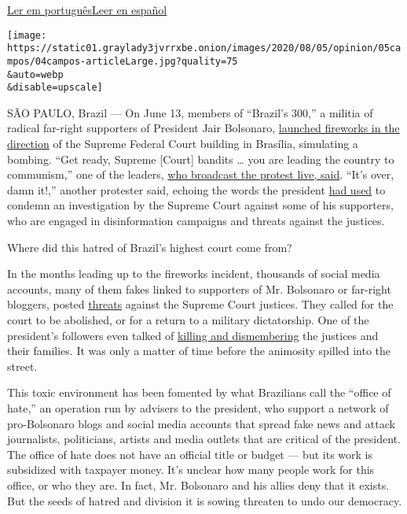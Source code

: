 \href{https://www.nytimes3xbfgragh.onion/pt/2020/08/04/opinion/international-world/bolsonaro-gabinete-do-odio.html}{Ler
em
português}\href{https://www.nytimes3xbfgragh.onion/es/2020/08/04/espanol/opinion/bolsonaro-oficina-odio-brasil.html}{Leer
en español}

\texttt{[image: https://static01.graylady3jvrrxbe.onion/images/2020/08/05/opinion/05campos/04campos-articleLarge.jpg?quality=75\\\&auto=webp\\\&disable=upscale]}

SÃO PAULO, Brazil --- On June 13, members of ``Brazil's 300,'' a militia
of radical far-right supporters of President Jair Bolsonaro,
\href{https://www1.folha.uol.com.br/poder/2020/05/sara-winter-xinga-moraes-diz-querer-trocar-socos-com-ele-e-promete-inferniza-lo.shtml}{launched
fireworks in the direction} of the Supreme Federal Court building in
Brasília, simulating a bombing. ``Get ready, Supreme {[}Court{]} bandits
\ldots{} you are leading the country to communism,'' one of the leaders,
\href{https://www.metropoles.com/brasil/video-bolsonaristas-lancam-fogos-de-artificio-em-predio-do-stf}{who
broadcast the protest live, said}. ``It's over, damn it!,'' another
protester said, echoing the words the president
\href{https://www.youtube.com/watch?v=I2bZoC8FHJI}{had used} to condemn
an investigation by the Supreme Court against some of his supporters,
who are engaged in disinformation campaigns and threats against the
justices.

Where did this hatred of Brazil's highest court come from?

In the months leading up to the fireworks incident, thousands of social
media accounts, many of them fakes linked to supporters of Mr. Bolsonaro
or far-right bloggers, posted
\href{https://www1.folha.uol.com.br/poder/2020/05/sara-winter-xinga-moraes-diz-querer-trocar-socos-com-ele-e-promete-inferniza-lo.shtml}{threats}
against the Supreme Court justices. They called for the court to be
abolished, or for a return to a military dictatorship. One of the
president's followers even talked of
\href{https://g1.globo.com/politica/noticia/2020/06/17/moraes-vota-pela-legalidade-e-continuidade-do-inquerito-das-fake-news.ghtml}{killing
and dismembering} the justices and their families. It was only a matter
of time before the animosity spilled into the street.

This toxic environment has been fomented by what Brazilians call the
``office of hate,'' an operation run by advisers to the president, who
support a network of pro-Bolsonaro blogs and social media accounts that
spread fake news and attack journalists, politicians, artists and media
outlets that are critical of the president. The office of hate does not
have an official title or budget --- but its work is subsidized with
taxpayer money. It's unclear how many people work for this office, or
who they are. In fact, Mr. Bolsonaro and his allies deny that it exists.
But the seeds of hatred and division it is sowing threaten to undo our
democracy.

